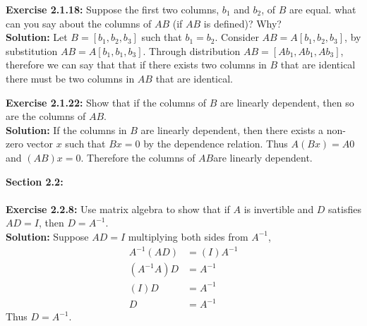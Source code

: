\documentclass{amsart}
\begin{document}
\noindent\textbf{Exercise 2.1.18: } Suppose the first two columns, $b_1$ and $b_2$, of $B$ are equal. what can you say about the columns of $AB$ (if $AB$ is defined)? Why?\\
\noindent \textbf{Solution: } Let $B =[b_1,b_2,b_3]$ such that $b_1=b_2$. Consider $AB = A[b_1,b_2,b_3]$, by substitution $AB = A[b_1,b_1,b_3]$. Through distribution $AB = [Ab_1,Ab_1,Ab_3]$, therefore we can say that that if there exists two columns in $B$ that are identical there must be two columns in $AB$ that are identical. 
\vspace{1in}

\noindent\textbf{Exercise 2.1.22: } Show that if the columns of $B$ are linearly dependent, then so are the columns of $AB$.\\
\noindent \textbf{Solution: } If the columns in $B$ are linearly dependent, then there exists a non-zero vector $x$ such that $Bx=0$ by the dependence relation. Thus $A(Bx)=A0$ and $(AB)x=0$. Therefore the columns of $AB$are linearly dependent.
\vspace{1in}





{\huge\textbf{Section 2.2:}}\\\\

\noindent\textbf{Exercise 2.2.8: } Use matrix algebra to show that if $A$ is invertible and $D$ satisfies $AD  = I$, then $D = A^{-1}$.\\
\noindent \textbf{Solution: }Suppose $AD=I$ multiplying both sides from $A^{-1}$,
\begin{align}
A^{-1}(AD)&=(I)A^{-1}\\
(A^{-1}A)D&=A^{-1}\\
(I)D&=A^{-1}\\
D&=A^{-1}
\end{align}
Thus $D=A^{-1}$.
\vspace{1in}
\end{document}
